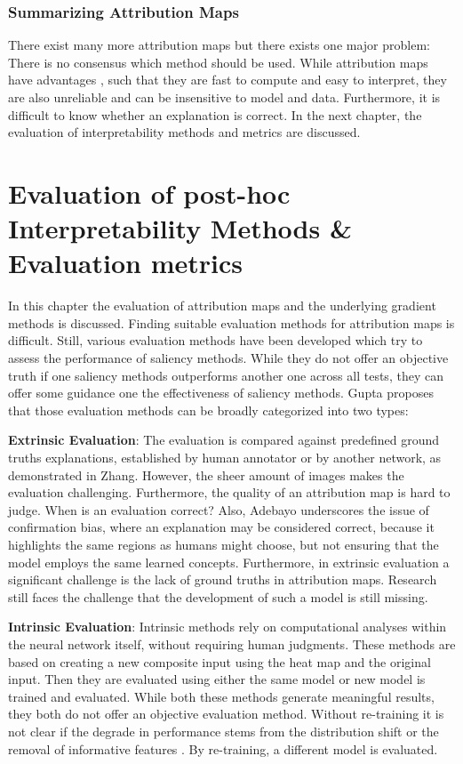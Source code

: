 \subsection{Summarizing Attribution Maps}

There exist many more attribution maps but there exists one major problem: There is no consensus which method should be used. While attribution maps have advantages \cite{molnar2022}, such that they are fast to compute and easy to interpret, they are also unreliable and can be insensitive to model and data. Furthermore, it is difficult to know whether an explanation is correct. In the next chapter, the evaluation of interpretability methods and metrics are discussed.


\newpage


\chapter{Evaluation of post-hoc Interpretability Methods \& Evaluation metrics}
\label{sec:evaluation}


In this chapter the evaluation of attribution maps and the underlying gradient methods is discussed. Finding suitable evaluation methods for attribution maps is difficult. Still, various evaluation methods have been developed which try to assess the performance of saliency methods. While they do not offer an objective truth if one saliency methods outperforms another one across all tests, they can offer some guidance one the effectiveness of saliency methods. Gupta\cite{gupta2022new} proposes that those evaluation methods can be broadly categorized into two types:

\textbf{Extrinsic Evaluation}: 
The evaluation is compared against predefined ground truths explanations, established by human annotator or by another network, as demonstrated in Zhang\cite{zhang2018}. However, the sheer amount of images makes the evaluation challenging. Furthermore, the quality of an attribution map is hard to judge. When is an evaluation correct? Also, Adebayo \cite{adebayo2020sanity} underscores the issue of confirmation bias, where an explanation may be considered correct, because it highlights the same regions as humans might choose, but not ensuring that the model employs the same learned concepts. Furthermore, in extrinsic evaluation a significant challenge is the lack of ground truths in attribution maps. Research still faces the challenge that the development of such a model is still missing.

\textbf{Intrinsic Evaluation}: 
Intrinsic methods rely on computational analyses within the neural network itself, without requiring human judgments. These methods are based on creating a new composite input using the heat map and the original input. Then they are evaluated using either the same model\cite{dabkowski2017real} or new model is trained and evaluated\cite{hooker2019benchmark}. While both these methods generate meaningful results, they both do not offer an objective evaluation method. Without re-training it is not clear if the degrade in performance stems from the distribution shift or the removal of informative features \cite{hooker2019benchmark}. By re-training, a different model is evaluated.
\\

